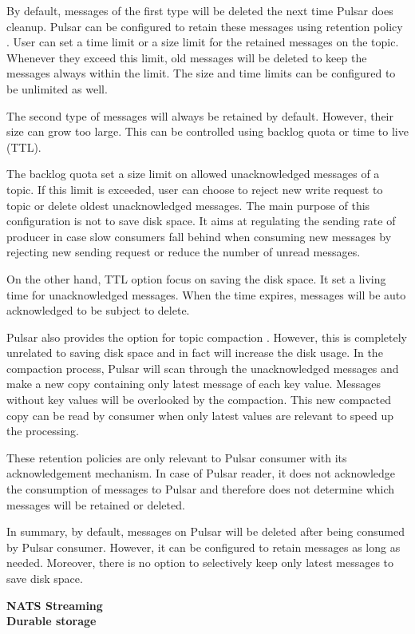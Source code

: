 By default, messages of the first type will be deleted the next time Pulsar does cleanup. Pulsar can be configured to retain these messages using retention policy \cite{pulsarretention}. User can set a time limit or a size limit for the retained messages on the topic. Whenever they exceed this limit, old messages will be deleted to keep the messages always within the limit. The size and time limits can be configured to be unlimited as well.

The second type of messages will always be retained by default. However, their size can grow too large. This can be controlled using backlog quota or time to live (TTL).

The backlog quota set a size limit on allowed unacknowledged messages of a topic. If this limit is exceeded, user can choose to reject new write request to topic or delete oldest unacknowledged messages. The main purpose of this configuration is not to save disk space. It aims at regulating the sending rate of producer in case slow consumers fall behind when consuming new messages by rejecting new sending request or reduce the number of unread messages.

On the other hand, TTL option focus on saving the disk space. It set a living time for unacknowledged messages. When the time expires, messages will be auto acknowledged to be subject to delete. 

Pulsar also provides the option for topic compaction \cite{pulsarconceptcompact}. However, this is completely unrelated to saving disk space and in fact will increase the disk usage. In the compaction process, Pulsar will scan through the unacknowledged messages and make a new copy containing only latest message of each key value. Messages without key values will be overlooked by the compaction. This new compacted copy can be read by consumer when only latest values are relevant to speed up the processing.

These retention policies are only relevant to Pulsar consumer with its acknowledgement mechanism. In case of Pulsar reader, it does not acknowledge the consumption of messages to Pulsar and therefore does not determine which messages will be retained or deleted.

In summary, by default, messages on Pulsar will be deleted after being consumed by Pulsar consumer. However, it can be configured to retain messages as long as needed. Moreover, there is no option to selectively keep only latest messages to save disk space.

\large \textbf{NATS Streaming}\\
\normalsize
\textbf{Durable storage}

